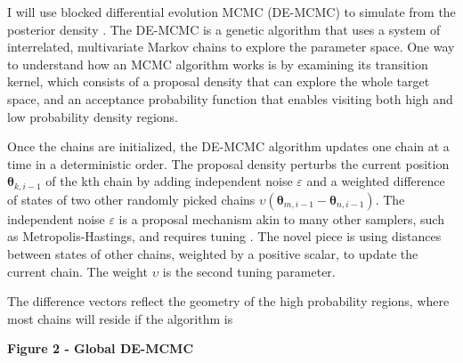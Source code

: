 \documentclass[12pt]{article}
\begin{document}
	I will use blocked differential evolution MCMC (DE-MCMC) to simulate from the posterior density \citep{Ter2006,TurSed2013}. The DE-MCMC is a genetic algorithm that uses a system of interrelated, multivariate Markov chains to explore the parameter space. One way to understand how an MCMC algorithm works is by examining its transition kernel, which consists of a proposal density that can explore the whole target space, and an acceptance probability function that enables visiting both high and low probability density regions.
    
	Once the chains are initialized, the DE-MCMC algorithm updates one chain at a time in a deterministic order. The proposal density perturbs the current position $\boldsymbol{\theta}_{k, i - 1}$ of the kth chain by adding independent noise $\varepsilon$ and a weighted difference of states of two other randomly picked chains $\upsilon(\boldsymbol{\theta}_{m, i - 1} - \boldsymbol{\theta}_{n, i - 1})$. The independent noise $\varepsilon$ is a proposal mechanism akin to many other samplers, such as Metropolis-Hastings, and requires tuning \citep{RobCas2004,GamLop2006}. The novel piece is using distances between states of other chains, weighted by a positive scalar, to update the current chain. The weight $\upsilon$ is the second tuning parameter. 
    
	The difference vectors reflect the geometry of the high probability regions, where most chains will reside if the algorithm is 

\vspace{5mm}
    
\centerline{\textbf{Figure 2 - Global DE-MCMC}}
\end{document}
